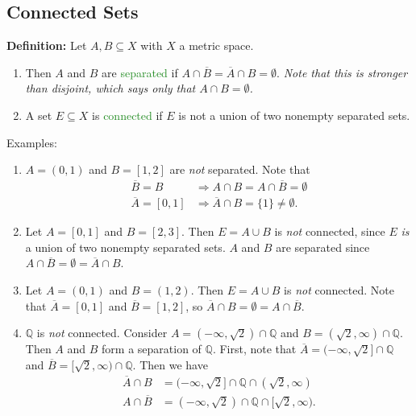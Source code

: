 \documentclass{article}
\begin{document}
\newpage

\subsection{Connected Sets}

\textbf{Definition:} Let $A, B \subseteq X$ with $X$ a metric space.
\begin{enumerate}
    \item Then $A$ and $B$ are \textcolor{ForestGreen}{separated} if $A \cap \overline{B} = \overline{A} \cap B = \emptyset$. \textit{Note that this is stronger than disjoint, which says only that $A \cap B = \emptyset$.}
    \item A set $E \subseteq X$ is \textcolor{ForestGreen}{connected} if $E$ is not a union of two nonempty separated sets.
\end{enumerate}

\textcolor{NavyBlue}{Examples:}
\begin{enumerate}
    \item $A=(0,1)$ and $B=[1,2]$ are \textit{not} separated. Note that 
    \begin{align*}
        \overline{B} = B &\Longrightarrow A \cap B = A \cap \overline{B} = \emptyset \\
        \overline{A} = [0,1] &\Longrightarrow \overline{A} \cap B = \{1\} \neq \emptyset.
    \end{align*}
    \item Let $A = [0,1]$ and $B = [2,3]$. Then $E = A \cup B$ is \textit{not} connected, since $E$ \textit{is} a union of two nonempty separated sets. $A$ and $B$ are separated since $A \cap \overline{B} = \emptyset = \overline{A} \cap B$.
    \item Let $A = (0,1)$ and $B = (1,2)$. Then $E = A \cup B$ is \textit{not} connected. Note that $\overline{A} = [0,1]$ and $\overline{B} = [1,2]$, so $\overline{A} \cap B = \emptyset = A \cap \overline{B}$.
    \item $\mathbb{Q}$ is \textit{not} connected. Consider $A = (-\infty, \sqrt{2}) \cap \mathbb{Q}$ and $B = (\sqrt{2}, \infty) \cap \mathbb{Q}$. Then $A$ and $B$ form a separation of $\mathbb{Q}$. First, note that $\overline{A} = (-\infty,\sqrt{2}] \cap \mathbb{Q}$ and $\overline{B} = [\sqrt{2}, \infty) \cap \mathbb{Q}$. Then we have
    \begin{align*}
        \overline{A} \cap B &= (-\infty, \sqrt{2}] \cap \mathbb{Q} \cap (\sqrt{2}, \infty) \\
        A \cap \overline{B} &= (-\infty, \sqrt{2}) \cap \mathbb{Q} \cap [\sqrt{2}, \infty).
    \end{align*}
\end{enumerate}
\end{document}
